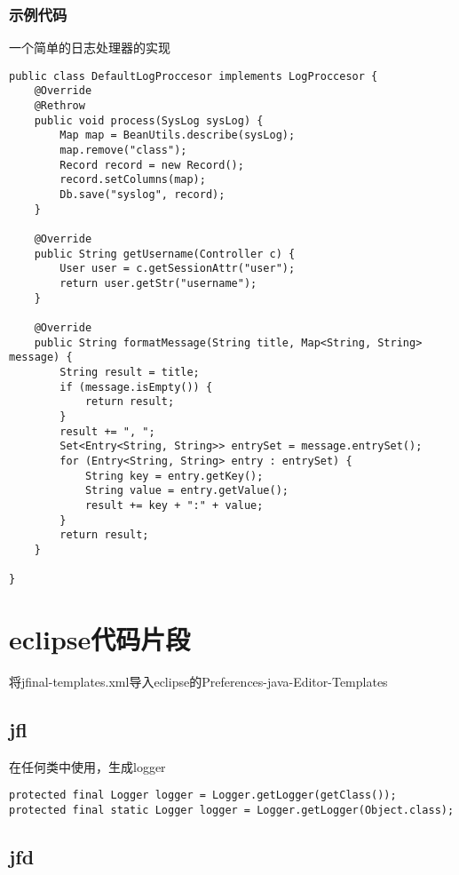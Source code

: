 \documentclass{scrartcl}
\begin{document}
\subsubsection{示例代码}
\label{sec-5-3-3}

一个简单的日志处理器的实现

\begin{verbatim}
public class DefaultLogProccesor implements LogProccesor {
    @Override
    @Rethrow
    public void process(SysLog sysLog) {
        Map map = BeanUtils.describe(sysLog);
        map.remove("class");
        Record record = new Record();
        record.setColumns(map);
        Db.save("syslog", record);
    }

    @Override
    public String getUsername(Controller c) {
        User user = c.getSessionAttr("user");
        return user.getStr("username");
    }

    @Override
    public String formatMessage(String title, Map<String, String> message) {
        String result = title;
        if (message.isEmpty()) {
            return result;
        }
        result += ", ";
        Set<Entry<String, String>> entrySet = message.entrySet();
        for (Entry<String, String> entry : entrySet) {
            String key = entry.getKey();
            String value = entry.getValue();
            result += key + ":" + value;
        }
        return result;
    }

}
\end{verbatim}
\section{eclipse代码片段}
\label{sec-6}

  将jfinal-templates.xml导入eclipse的Preferences-java-Editor-Templates
\subsection{jfl}
\label{sec-6-1}

   在任何类中使用，生成logger
  

\begin{verbatim}
protected final Logger logger = Logger.getLogger(getClass());
protected final static Logger logger = Logger.getLogger(Object.class);
\end{verbatim}
\subsection{jfd}
\label{sec-6-2}
\end{document}
